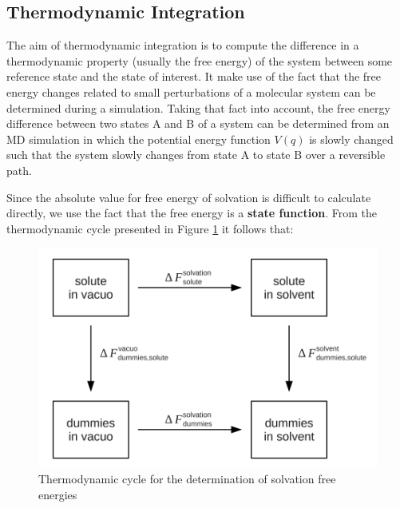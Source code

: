 \subsection{Thermodynamic Integration}\label{subsec:TI}

The aim of thermodynamic integration is to compute the difference in a thermodynamic property (usually the free energy) of the system between some reference state and the state of interest. It make use of the fact that the free energy changes related to small perturbations of a molecular system can be determined during a simulation. Taking that fact into account, the free energy difference between two states A and B of a system can be determined from an MD simulation in which the potential energy function $V(q)$ is slowly changed such that the system slowly changes from state A to state B over a reversible path.

Since the absolute value for free energy of solvation is difficult to calculate directly, we use the fact that the free energy is a \textbf{state function}. From the thermodynamic cycle presented in Figure \ref{fig:TI_cicle} it follows that:
\begin{figure}[h]
    \centering
    \includegraphics[scale=0.6]{Figures/Chapter 3/Ciclo_termodinamico.png}
    \caption{Thermodynamic cycle for the determination of solvation free energies}
    \label{fig:TI_cicle}
\end{figure}

